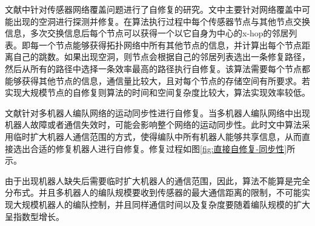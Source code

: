 文献\parencite{Auto-holeDetection}中针对传感器网络覆盖问题进行了自修复的研究。文中主要针对网络覆盖中可能出现的空洞进行探测并修复。在算法执行过程中每个传感器节点与其他节点交换信息，多次交换信息后每个节点可以获得一个以它自身为中心的x-hop的邻居列表。即每一个节点能够获得拓扑网络中所有其他节点的信息，并计算出每个节点距离自己的跳数。如果出现空洞，则节点会根据自己的邻居列表选出一条修复路径，然后从所有的路径中选择一条效率最高的路径执行自修复。该算法需要每个节点都能够获得其他节点的信息，通信量比较大，且对每个节点的存储空间有所要求。若实现大规模节点的自修复则算法的时间和空间复杂度比较大，算法实现效率较低。

文献\parencite{Zhang2006Motion}针对多机器人编队网络的运动同步性进行自修复。当多机器人编队网络中出现机器人故障或者通信失效时，可能会影响整个网络的运动同步性。此时文中算法采用临时扩大机器人通信范围的方式，使得编队中所有机器人能够共享信息，从而直接选出合适的修复机器人进行自修复。修复过程如图\ref{fig:直接自修复-同步性}所示。
\begin{figure*}[!htbp]
	\begin{multicols}{2}
		\begin{center}
		\end{center}
		\begin{center}
		\end{center}
		\begin{center}
		\end{center}
		\begin{center}
		\end{center}
	\end{multicols}
\end{figure*}
由于出现机器人缺失后需要临时扩大机器人的通信范围，因此，算法不能算是完全分布式。并且多机器人的编队规模要收到传感器的最大通信距离的限制，不可能实现大规模机器人的编队控制，并且同样通信时间以及复杂度要随着编队规模的扩大呈指数型增长。

